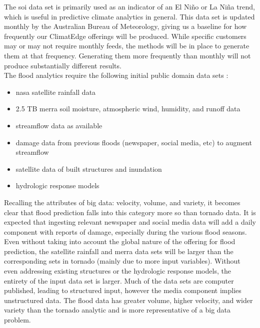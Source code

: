The \gls{soi} data set is primarily used as an indicator of an El Niño or La Niña trend, which is useful in predictive climate analytics in general. This data set is updated monthly by the Australian Bureau of Meteorology, giving us a baseline for how frequently our ClimatEdge\texttrademark{} offerings will be produced. While specific customers may or may not require monthly feeds, the methods will be in place to generate them at that frequency. Generating them more frequently than monthly will not produce substantially different results.\\

The flood analytics require the following initial public domain data sets \cite{walker}:
\begin{itemize}
    \item \gls{nasa} satellite rainfall data
    \item 2.5 TB \gls{merra} soil moisture, atmospheric wind, humidity, and runoff data
    \item streamflow data as available
    \item damage data from previous floods (newspaper, social media, etc) to augment streamflow
    \item satellite data of built structures and inundation
    \item hydrologic response models
\end{itemize}
Recalling the attributes of big data: velocity, volume, and variety, it becomes clear that flood prediction falls into this category more so than tornado data. It is expected that ingesting relevant newspaper and social media data will add a daily component with reports of damage, especially during the various flood seasons. Even without taking into account the global nature of the offering for flood prediction, the satellite rainfall and \gls{merra} data sets will be larger than the corresponding sets in tornado (mainly due to more input variables). Without even addressing existing structures or the hydrologic response models, the entirety of the input data set is larger. Much of the data sets are computer published, leading to structured input, however the media component implies unstructured data. The flood data has greater volume, higher velocity, and wider variety than the tornado analytic and is more representative of a big data problem.\\


